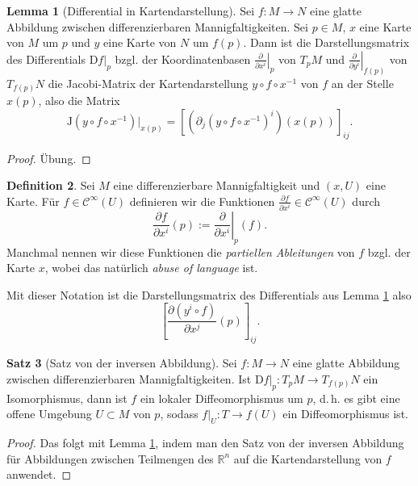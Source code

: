 \documentclass[a4paper]{scrreprt}
\numberwithin{equation}{chapter}
\newcommand{\DD}{\mathrm{D}}
\newcommand{\R}{\mathbb{R}}
\newcommand{\sC}{\mathcal{C}^{\infty}}
\theoremstyle{definition}
\newtheorem{defn}{Definition}[section]
\newtheorem{lemma}[defn]{Lemma}
\newtheorem{satz}[defn]{Satz}
\newcommand{\bewUeb}{\begin{proof}Übung.\end{proof}}
\begin{document}
\begin{lemma}[Differential in Kartendarstellung] \label{lemma:differential_koord}
	Sei $f\colon M \to N$ eine glatte Abbildung zwischen differenzierbaren Mannigfaltigkeiten. Sei $p\in M$, $x$ eine Karte von $M$ um $p$ und $y$ eine Karte von $N$ um $f(p)$. Dann ist die Darstellungsmatrix des Differentials $\left.\DD f\right|_p$ bzgl. der Koordinatenbasen $\left.\frac{\partial}{\partial x^i}\right|_p$ von $T_pM$ und $\left.\frac{\partial}{\partial y^i}\right|_{f(p)}$ von $T_{f(p)}N$ die Jacobi-Matrix der Kartendarstellung $y \circ f \circ x^{-1}$ von $f$ an der Stelle $x(p)$, also die Matrix
	\[\mathrm{J}(y\circ f\circ x^{-1})|_{x(p)} = \left[\left(\partial_j(y\circ f\circ x^{-1})^i\right) (x(p)) \right]_{ij}.\]
	\bewUeb
\end{lemma}

\begin{defn}
	Sei $M$ eine differenzierbare Mannigfaltigkeit und $(x,U)$ eine Karte. Für $f \in \sC(U)$ definieren wir die Funktionen $\frac{\partial f}{\partial x^i} \in \sC(U)$ durch
	\[\frac{\partial f}{\partial x^i}(p) := \left.\frac{\partial}{\partial x^i}\right|_p(f).\]
	Manchmal nennen wir diese Funktionen die \emph{partiellen Ableitungen} von $f$ bzgl. der Karte $x$, wobei das natürlich \emph{abuse of language} ist.
\end{defn}

Mit dieser Notation ist die Darstellungsmatrix des Differentials aus Lemma \ref{lemma:differential_koord} also
\[\left[\frac{\partial(y^i \circ f)}{\partial x^j}(p)\right]_{ij}.\]

\begin{satz}[Satz von der inversen Abbildung]
	Sei $f\colon M \to N$ eine glatte Abbildung zwischen differenzierbaren Mannigfaltigkeiten. Ist $\left.\DD f\right|_p\colon T_pM \to T_{f(p)}N$ ein Isomorphismus, dann ist $f$ ein lokaler Diffeomorphismus um $p$, d.\,h. es gibt eine offene Umgebung $U\subset M$ von $p$, sodass $f|_U \colon T \to f(U)$ ein Diffeomorphismus ist.

	\begin{proof}
		Das folgt mit Lemma \ref{lemma:differential_koord}, indem man den Satz von der inversen Abbildung für Abbildungen zwischen Teilmengen des $\R^n$ auf die Kartendarstellung von $f$ anwendet.
	\end{proof}
\end{satz}
\end{document}
